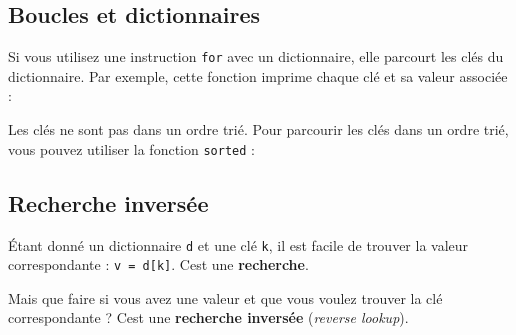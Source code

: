 \hypertarget{boucles-et-dictionnaires}{%
\subsection{Boucles et dictionnaires}\label{boucles-et-dictionnaires}}

Si vous utilisez une instruction \texttt{for} avec un dictionnaire, elle
parcourt les clés du dictionnaire. Par exemple, cette fonction imprime
chaque clé et sa valeur associée :

\begin{Shaded}
\begin{Highlighting}[]
\end{Highlighting}
\end{Shaded}

Les clés ne sont pas dans un ordre trié. Pour parcourir les clés dans un
ordre trié, vous pouvez utiliser la fonction \texttt{sorted} :

\begin{Shaded}
\begin{Highlighting}[]
 
\end{Highlighting}
\end{Shaded}

\hypertarget{recherche-inversuxe9e}{%
\subsection{Recherche inversée}\label{recherche-inversuxe9e}}

Étant donné un dictionnaire \texttt{d} et une clé \texttt{k}, il est
facile de trouver la valeur correspondante : \texttt{v\ =\ d{[}k{]}}.
C\textquotesingle est une \textbf{recherche}.

Mais que faire si vous avez une valeur et que vous voulez trouver la clé
correspondante ? C\textquotesingle est une \textbf{recherche inversée}
(\emph{reverse lookup}).

\begin{Shaded}
\begin{Highlighting}[]
        \OperatorTok{==}
         \NormalTok{(}\NormalTok{)}
\end{Highlighting}
\end{Shaded}

